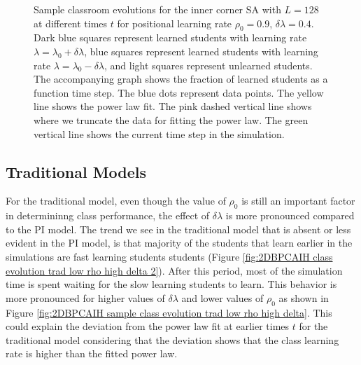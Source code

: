 \begin{figure}[htbp!]
   \caption{Sample classroom evolutions for the inner corner SA with $L=128$ at different times $t$ for positional learning rate $\rho_0=0.9$, $\delta\lambda = 0.4$.
   Dark blue squares represent learned students with learning rate $\lambda = \lambda_0 + \delta\lambda$, blue squares represent learned students with learning rate $\lambda = \lambda_0 - \delta\lambda$, and light squares represent unlearned students.
   The accompanying graph shows the fraction of learned students as a function time step.
   The blue dots represent data points. 
   The yellow line shows the power law fit.
   The pink dashed vertical line shows where we truncate the data for fitting the power law.
   The green vertical line shows the current time step in the simulation.
   }
   \label{fig:2DBPCAIH sample class evolution high rho high delta}
\end{figure}

\subsection{Traditional Models}
For the traditional model, even though the value of $\rho_0$ is still an important factor in determininng class performance, the effect of $\delta\lambda$ is more pronounced compared to the PI model.
The trend we see in the traditional model that is absent or less evident in the PI model, is that majority of the students that learn earlier in the simulations are fast learning students students (Figure \ref{fig:2DBPCAIH class evolution trad low rho high delta 2}). 
After this period, most of the simulation time is spent waiting for the slow learning students to learn.
This behavior is more pronounced for higher values of $\delta\lambda$ and lower values of $\rho_0$ as shown in Figure \ref{fig:2DBPCAIH sample class evolution trad low rho high delta}.
This could explain the deviation from the power law fit at earlier times $t$ for the traditional model considering that the deviation shows that the class learning rate is higher than the fitted power law.

